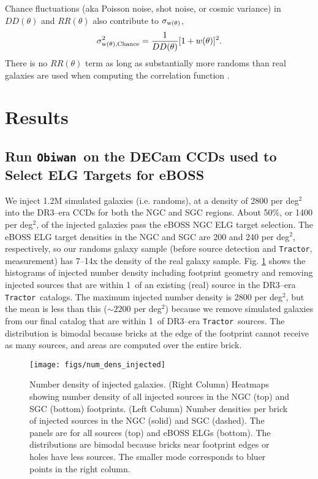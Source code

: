 \documentclass[a4paper,fleqn,usenatbib]{mnras}
\newcommand{\tractor}{{\tt Tractor}}
\newcommand{\legacypipe}{{\tt Legacypipe}}
\newcommand{\obiwan}{{\tt Obiwan}}
\begin{document}
Chance fluctuations (aka Poisson noise, shot noise, or cosmic variance) in $DD(\theta)$ and $RR(\theta)$ also contribute to $\sigma_{\rm{w(\theta)}}$,
\begin{align}
\sigma_{\rm{w(\theta), Chance}}^2 = \frac{1}{DD(\theta)}[1+w(\theta) ]^2. \label{eqn:sigma-chance}
\end{align}
\noindent There is no $RR(\theta)$ term as long as substantially more randoms than real galaxies are used when computing the correlation function \citep{corrfuncIC}.


\section{Results}
\label{sec:results}

\subsection{Run \obiwan\, on the DECam CCDs used to Select ELG Targets for eBOSS}

We inject 1.2M simulated galaxies (i.e. randoms), at a density of 2800 per deg$^2$ into the DR3--era CCDs for both the NGC and SGC regions. About 50\%, or 1400 per deg$^2$, of the injected galaxies pass the eBOSS NGC ELG target selection. The eBOSS ELG target densities in the NGC and SGC are 200 and 240 per deg$^2$, respectively, so our randoms galaxy sample (before source detection and \tractor, measurement) has 7--14x the density of the real galaxy sample. Fig. \ref{fig:number-density-eboss} shows the histograms of injected number density including footprint geometry and removing injected sources that are within 1\arcsec\, of an existing (real) source in the DR3--era \tractor\, catalogs. The maximum injected number density is 2800 per deg$^2$, but the mean is less than this ($\sim 2200$ per deg$^2$) because we remove simulated galaxies from our final catalog that are within 1\arcsec\, of DR3--era \tractor\, sources. The distribution is bimodal because bricks at the edge of the footprint cannot receive as many sources, and areas are computed over the entire brick.

\begin{figure}
\begin{center}
 \texttt{[image: figs/num\_dens\_injected]}
\end{center}
 \caption[Number density of injected galaxies]{Number density of injected galaxies. (Right Column) Heatmaps showing number density of all injected sources in the NGC (top) and SGC (bottom) footprints. (Left Column) Number densities per brick of injected sources in the NGC (solid) and SGC (dashed). The panels are for all sources (top) and eBOSS ELGs (bottom). The distributions are bimodal because bricks near footprint edges or holes have less sources. The smaller mode corresponds to bluer points in the right column.}
 \label{fig:number-density-eboss}
\end{figure} 
\end{document}
